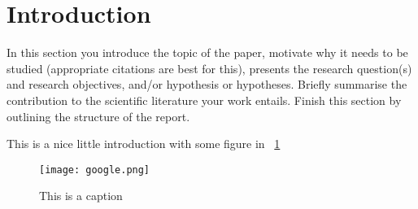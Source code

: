 
\section{Introduction}
\label{sec:Introduction}

In this section you introduce the topic of the paper, motivate why it needs to be studied (appropriate citations are best for this), presents the research question(s) and research objectives, and/or hypothesis or hypotheses. Brieﬂy summarise the contribution to the scientiﬁc literature your work entails. Finish this section by outlining the structure of the report.

This is a nice little introduction with some figure in \figurename~\ref{fig:figureExample}

\begin{figure}[htp]
\begin{center}
\texttt{[image: google.png]}
\caption{This is a caption}
\label{fig:figureExample}
\end{center}
\end{figure} 

